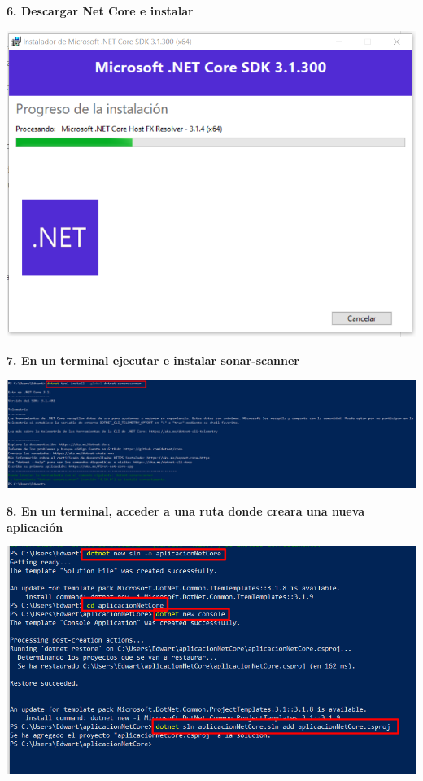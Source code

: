 \documentclass{article}
\begin{document}
\newpage
\textbf{6. Descargar Net Core e instalar}

    \begin{center}
		\includegraphics[width=15cm]{./images/6} 
	\end{center}

\textbf{7. En un terminal ejecutar e instalar sonar-scanner}

    \begin{center}
		\includegraphics[width=15cm]{./images/7} 
	\end{center}
\newpage
\textbf{8. En un terminal, acceder a una ruta donde creara una nueva aplicación}

    \begin{center}
		\includegraphics[width=15cm]{./images/8} 
	\end{center}
	
\end{document}
